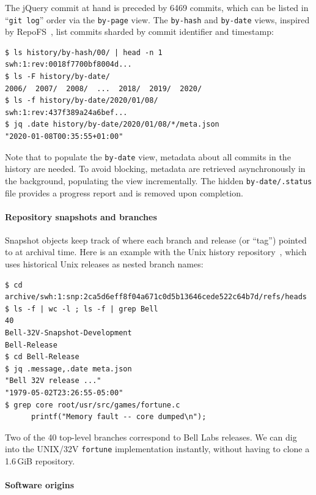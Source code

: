 The jQuery commit at hand is preceded by \num{6469} commits, which can be
listed in ``\texttt{git log}'' order via the \texttt{by-page} view. The
\texttt{by-hash} and \texttt{by-date} views, inspired by
RepoFS~\cite{spinellis2019repofs}, list commits sharded by commit identifier
and timestamp:

\begin{verbatim}
$ ls history/by-hash/00/ | head -n 1
swh:1:rev:0018f7700bf8004d...
$ ls -F history/by-date/
2006/  2007/  2008/  ...  2018/  2019/  2020/
$ ls -f history/by-date/2020/01/08/
swh:1:rev:437f389a24a6bef...
$ jq .date history/by-date/2020/01/08/*/meta.json
"2020-01-08T00:35:55+01:00"
\end{verbatim}

Note that to populate the \texttt{by-date} view, metadata about all commits in
the history are needed. To avoid blocking, metadata are retrieved asynchronously
in the background, populating the view incrementally. The hidden
\texttt{by-date/.status} file provides a progress report and is removed upon
completion.


\paragraph{Repository snapshots and branches}

Snapshot objects keep track of where each branch and release (or ``tag'')
pointed to at archival time. Here is an example with the Unix history
repository~\cite{SpinellisUnix2017}, which uses historical Unix releases as
nested branch names:

\begin{verbatim}
$ cd archive/swh:1:snp:2ca5d6eff8f04a671c0d5b13646cede522c64b7d/refs/heads
$ ls -f | wc -l ; ls -f | grep Bell
40
Bell-32V-Snapshot-Development
Bell-Release
$ cd Bell-Release
$ jq .message,.date meta.json
"Bell 32V release ..."
"1979-05-02T23:26:55-05:00"
$ grep core root/usr/src/games/fortune.c
      printf("Memory fault -- core dumped\n");
\end{verbatim}

Two of the 40 top-level branches correspond to Bell Labs releases. We can dig
into the UNIX/32V \texttt{fortune} implementation instantly, without having to
clone a 1.6\,GiB repository.


\paragraph{Software origins}

